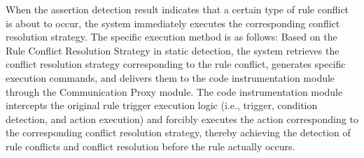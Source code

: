 When the assertion detection result indicates that a certain type of rule conflict is about to occur, the system immediately executes the corresponding conflict resolution strategy. The specific execution method is as follows: Based on the Rule Conflict Resolution Strategy in static detection, the system retrieves the conflict resolution strategy corresponding to the rule conflict, generates specific execution commands, and delivers them to the code instrumentation module through the Communication Proxy module. The code instrumentation module intercepts the original rule trigger execution logic (i.e., trigger, condition detection, and action execution) and forcibly executes the action corresponding to the corresponding conflict resolution strategy, thereby achieving the detection of rule conflicts and conflict resolution before the rule actually occurs.
